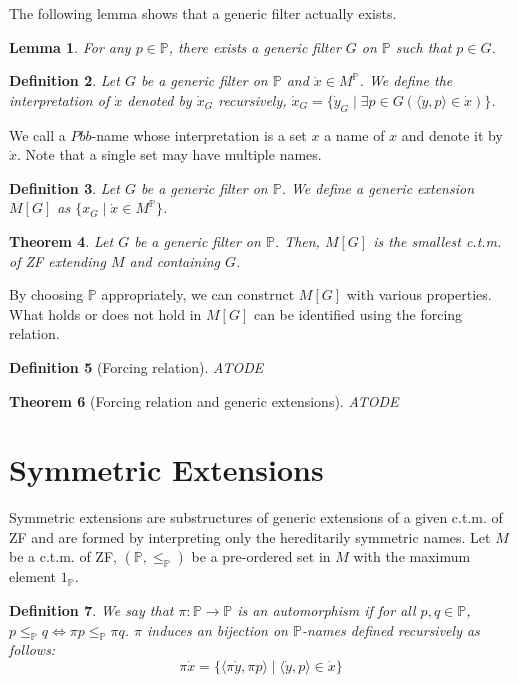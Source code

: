 \documentclass{report}
\newtheorem{thm}{Theorem}[chapter]
\newtheorem{lem}[thm]{Lemma}
\newtheorem{dfn}[thm]{Definition}
\newcommand{\Pbb}{\mathbb{P}}
\begin{document}
The following lemma shows that a generic filter actually exists.
\begin{lem} 
  For any $p \in \Pbb$, there exists a generic filter $G$ on $\Pbb$ such that $p \in G$.
\end{lem}

\begin{dfn} 
  Let $G$ be a generic filter on $\Pbb$ and $\dot{x} \in M^{\Pbb}$. We define the \emph{interpretation} of $\dot{x}$ denoted by $\dot{x}_G$ recursively, 
  $\dot{x}_G = \{\dot{y}_G \mid \exists p \in G (\langle \dot{y}, p \rangle \in \dot{x})\}$. 
\end{dfn}

We call a $Pbb$-name whose interpretation is a set $x$ a name of $x$ and denote it by $\dot{x}$.
Note that a single set may have multiple names.

\begin{dfn} 
  Let $G$ be a generic filter on $\Pbb$. We define a \emph{generic extension} $M[G]$ as $\{x_G \mid \dot{x} \in M^{\Pbb}\}$.
\end{dfn}

\begin{thm} 
  Let $G$ be a generic filter on $\Pbb$. Then, $M[G]$ is the smallest c.t.m. of ZF extending $M$ and containing $G$.
\end{thm}

By choosing $\Pbb$ appropriately, we can construct $M[G]$ with various properties.
What holds or does not hold in $M[G]$ can be identified using the forcing relation.

\begin{dfn} [Forcing relation]
  ATODE
\end{dfn}

\begin{thm} [Forcing relation and generic extensions]
  ATODE
\end{thm}

\section{Symmetric Extensions}
Symmetric extensions are substructures of generic extensions of a given c.t.m. of ZF 
and are formed by interpreting only the hereditarily symmetric names.
Let $M$ be a c.t.m. of ZF, $(\Pbb, \leq_{\Pbb})$ be a pre-ordered set in $M$ with the maximum element $1_{\Pbb}$.


\begin{dfn} 
  We say that $\pi : \Pbb \rightarrow \Pbb$ is an \emph{automorphism} if for all $p, q \in \Pbb$, $p \leq_{\Pbb} q \Leftrightarrow \pi p \leq_{\Pbb} \pi q$.
  $\pi$ induces an bijection on $\Pbb$-names defined recursively as follows:
  $$ \pi \dot{x} = \{ \langle \pi \dot{y}, \pi p \rangle \mid \langle \dot{y}, p \rangle \in \dot{x} \} $$
\end{dfn}
\end{document}
